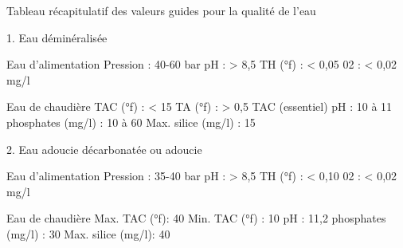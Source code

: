 Tableau récapitulatif des valeurs guides pour la qualité de l'eau


1. Eau déminéralisée 

Eau d'alimentation
Pression : 40-60 bar
pH : > 8,5
TH (°f) : < 0,05
02 : < 0,02 mg/l


Eau de chaudière
TAC (°f) : < 15
TA (°f) : > 0,5 TAC (essentiel)
pH : 10 à 11
phosphates (mg/l) : 10 à 60
Max. silice (mg/l) : 15




2. Eau adoucie décarbonatée ou adoucie 

Eau d'alimentation
Pression : 35-40 bar
pH : > 8,5
TH (°f) : < 0,10
02 : < 0,02 mg/l


Eau de chaudière
Max. TAC (°f): 40
Min. TAC (°f) : 10
pH : 11,2
phosphates (mg/l) : 30
Max. silice (mg/l): 40


